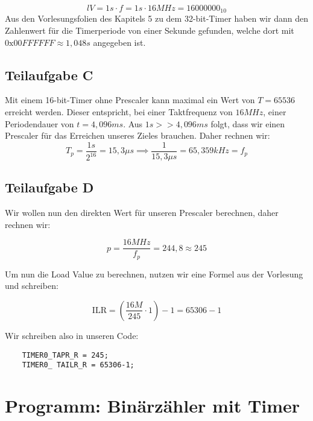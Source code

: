 \documentclass{article}
\begin{document}
\begin{equation}
    lV = 1s \cdot f = 1s \cdot 16MHz = 16000000_{10}
\end{equation}
Aus den Vorlesungsfolien des Kapitels 5 zu dem 32-bit-Timer haben wir dann den Zahlenwert für die Timerperiode von einer Sekunde gefunden, welche dort mit $0\mathrm{x}00FFFFFF \approx 1,048s$ angegeben ist.

\subsection{Teilaufgabe C}

Mit einem 16-bit-Timer ohne Prescaler kann maximal ein Wert von $T = 65536$ erreicht werden. Dieser entspricht, bei einer Taktfrequenz von $16MHz$, einer Periodendauer von $t = 4,096 ms$. Aus $1s >> 4,096ms$ folgt, dass wir einen Prescaler für das Erreichen unseres Zieles brauchen. Daher rechnen wir:
\begin{equation}
    T_{p} = \frac{1s}{2^{16}} = 15,3\mu s \implies \frac{1}{15,3 \mu s} = 65,359kHz = f_p
\end{equation}

\subsection{Teilaufgabe D}

Wir wollen nun den direkten Wert für unseren Prescaler berechnen, daher rechnen wir:

\begin{equation}
    p = \frac{16MHz}{f_{p}} = 244,8 \approx 245
\end{equation}

Um nun die Load Value zu berechnen, nutzen wir eine Formel aus der Vorlesung und schreiben:

\begin{equation}
    \mathrm{ILR} = (\frac{16M}{245} \cdot 1) - 1 = 65306 - 1
\end{equation}

Wir schreiben also in unseren Code:

\begin{verbatim}
    TIMER0_TAPR_R = 245;
    TIMER0_ TAILR_R = 65306-1;
\end{verbatim}

\section{Programm: Binärzähler mit Timer}
\end{document}
